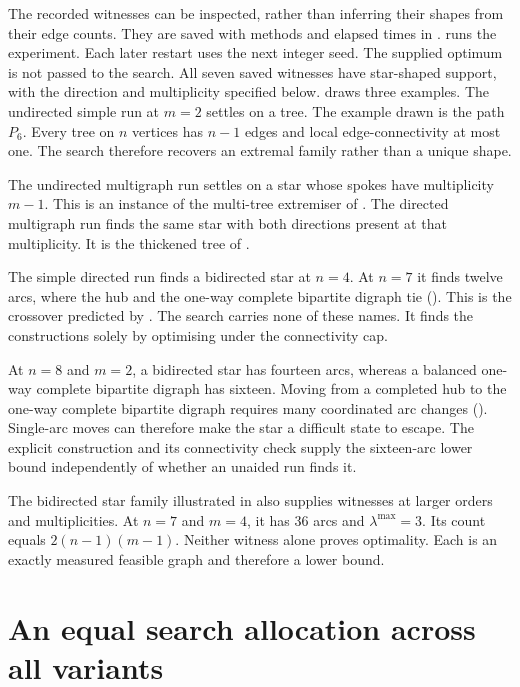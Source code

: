 The recorded witnesses can be inspected, rather than inferring their shapes from their edge counts. They are saved with methods and elapsed times in .  runs the experiment. Each later restart uses the next integer seed. The supplied optimum is not passed to the search. All seven saved witnesses have star-shaped support, with the direction and multiplicity specified below.
 draws three examples.
The undirected simple run at $m = 2$ settles on a tree. The example drawn is the path $P_6$.
Every tree on $n$ vertices has $n-1$ edges and local edge-connectivity at most one.
The search therefore recovers an extremal family rather than a unique shape.

The undirected multigraph run settles on a star whose spokes have multiplicity $m-1$.
This is an instance of the multi-tree extremiser of .
The directed multigraph run finds the same star with both directions present at that multiplicity.
It is the thickened tree of .

The simple directed run finds a bidirected star at $n=4$.
At $n=7$ it finds twelve arcs, where the hub and the one-way complete bipartite digraph tie ().
This is the crossover predicted by .
The search carries none of these names.
It finds the constructions solely by optimising under the connectivity cap.

At $n=8$ and $m=2$, a bidirected star has fourteen arcs, whereas a balanced one-way complete bipartite digraph has sixteen.
Moving from a completed hub to the one-way complete bipartite digraph requires many coordinated arc changes ().
Single-arc moves can therefore make the star a difficult state to escape.
The explicit construction and its connectivity check supply the sixteen-arc lower bound independently of whether an unaided run finds it.

The bidirected star family illustrated in  also supplies witnesses at larger orders and multiplicities.
At $n=7$ and $m=4$, it has $36$ arcs and $\lambda^{\max}=3$.
Its count equals $2(n-1)(m-1)$.
Neither witness alone proves optimality.
Each is an exactly measured feasible graph and therefore a lower bound.

\section{An equal search allocation across all variants}\label{sec:equal-budget}

